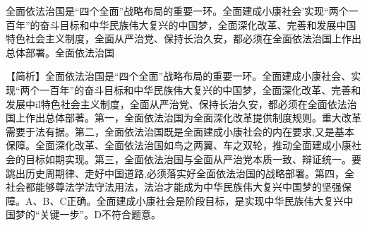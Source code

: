 \question 全面依法治国是``四个全面''战略布局的重要一环。全面建成小康社会'实现``两个一百年''的奋斗目标和中华民族伟大复兴的中国梦，全面深化改革、完善和发展中国特色社会主义制度，全面从严治党、保持长治久安，都必须在全面依法治国上作出总体部署。全面依法治国
\par{}
\begin{solution}【简析】全面依法治国是``四个全面''战略布局的重要一环。全面建成小康社会、实现``两个一百年''的奋斗目标和中华民族伟大复兴的中国梦，全面深化改革、完善和发展中il特色社会主义制度，全面从严治党、保持长治久安，都必须在全面依法治国上作出总体部著。第一，全面依法治国为全面深化改革提供制度规则。重大改革需要于法有据。第二，全面依法治国既是全面建成小康社会的内在要求,又是基本保障。全面深化改革、全面依法治国如鸟之两翼、车之双轮，推动全面建成小康社会的目标如期实现。第三，全面依法治国与全面从严治党本质一致、辩证统一。要跳出历史周期律、走好中国道路,必须落实好全面依法治国的战略部署。第四，全社会都能够尊法学法守法用法，法治才能成为中华民族伟大复兴中国梦的坚强保障。A、B、C正确。全面建成小康社会是阶段目标，是实现中华民族伟大复兴中国梦的``关键一步''。D不符合题意。
\end{solution}
